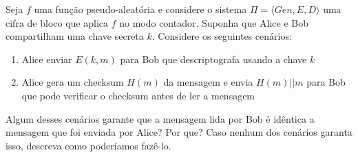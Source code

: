 \begin{exercicio}
  Seja $f$ uma função pseudo-aleatória e considere o sistema $\Pi = \langle Gen, E, D \rangle$ uma cifra de bloco que aplica $f$ no modo contador.
  Suponha que Alice e Bob compartilham uma chave secreta $k$.
  Considere os seguintes cenários:
  \begin{enumerate}
  \item Alice enviar $E(k, m)$ para Bob que descriptografa usando a chave $k$
  \item Alice gera um checksum $H(m)$ da mensagem e envia $H(m)||m$ para Bob que pode verificar o checksum antes de ler a mensagem
  \end{enumerate}
  Algum desses cenários garante que a mensagem lida por Bob é idêntica a mensagem que foi enviada por Alice? Por que? Caso nenhum dos cenários garanta isso, descreva como poderíamos fazê-lo. 
\end{exercicio}